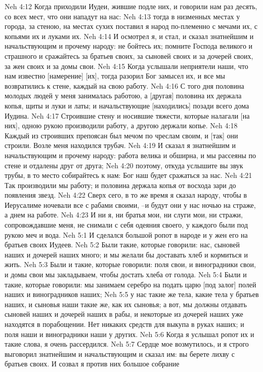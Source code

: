 Neh 4:12  Когда приходили Иудеи, жившие подле них, и говорили нам раз десять, со всех мест, что они нападут на нас:
Neh 4:13  тогда в низменных местах у города, за стеною, на местах сухих поставил я народ по-племенно с мечами их, с копьями их и луками их.
Neh 4:14  И осмотрел я, и стал, и сказал знатнейшим и начальствующим и прочему народу: не бойтесь их; помните Господа великого и страшного и сражайтесь за братьев своих, за сыновей своих и за дочерей своих, за жен своих и за домы свои.
Neh 4:15  Когда услышали неприятели наши, что нам известно [намерение] [их], тогда разорил Бог замысел их, и все мы возвратились к стене, каждый на свою работу.
Neh 4:16  С того дня половина молодых людей у меня занималась работою, а [другая] половина их держала копья, щиты и луки и латы; и начальствующие [находились] позади всего дома Иудина.
Neh 4:17  Строившие стену и носившие тяжести, которые налагали [на них], одною рукою производили работу, а другою держали копье.
Neh 4:18  Каждый из строивших препоясан был мечом по чреслам своим, и [так] они строили. Возле меня находился трубач.
Neh 4:19  И сказал я знатнейшим и начальствующим и прочему народу: работа велика и обширна, и мы рассеяны по стене и отдалены друг от друга;
Neh 4:20  поэтому, откуда услышите вы звук трубы, в то место собирайтесь к нам: Бог наш будет сражаться за нас.
Neh 4:21  Так производили мы работу; и половина держала копья от восхода зари до появления звезд.
Neh 4:22  Сверх сего, в то же время я сказал народу, чтобы в Иерусалиме ночевали все с рабами своими, --и будут они у нас ночью на страже, а днем на работе.
Neh 4:23  И ни я, ни братья мои, ни слуги мои, ни стражи, сопровождавшие меня, не снимали с себя одеяния своего, у каждого были под рукою меч и вода.
Neh 5:1  И сделался большой ропот в народе и у жен его на братьев своих Иудеев.
Neh 5:2  Были такие, которые говорили: нас, сыновей наших и дочерей наших много; и мы желали бы доставать хлеб и кормиться и жить.
Neh 5:3  Были и такие, которые говорили: поля свои, и виноградники свои, и домы свои мы закладываем, чтобы достать хлеба от голода.
Neh 5:4  Были и такие, которые говорили: мы занимаем серебро на подать царю [под залог] полей наших и виноградников наших;
Neh 5:5  у нас такие же тела, какие тела у братьев наших, и сыновья наши такие же, как их сыновья; а вот, мы должны отдавать сыновей наших и дочерей наших в рабы, и некоторые из дочерей наших уже находятся в порабощении. Нет никаких средств для выкупа в руках наших; и поля наши и виноградники наши у других.
Neh 5:6  Когда я услышал ропот их и такие слова, я очень рассердился.
Neh 5:7  Сердце мое возмутилось, и я строго выговорил знатнейшим и начальствующим и сказал им: вы берете лихву с братьев своих. И созвал я против них большое собрание
